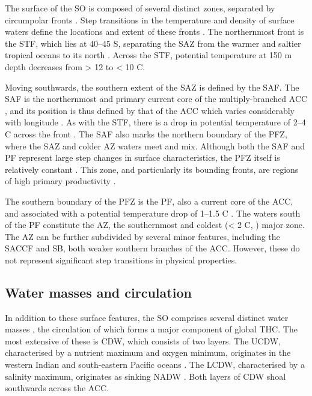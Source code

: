 The surface of the \ac{SO} is composed of several distinct zones, separated by circumpolar fronts .
Step transitions in the temperature and density of surface waters define the locations and extent of these fronts \cite{Sokolov:2002tc,Orsi:1995va}.
The northernmost front is the \ac{STF}, which lies at \textapprox{}40--45\textdegree{} S, separating the \ac{SAZ} from the warmer and saltier tropical oceans to its north \cite{Sokolov:2002tc}.
Across the \ac{STF}, potential temperature at 150 m depth decreases from \textgreater{} 12 to \textless{} 10 \textdegree{}C.

Moving southwards, the southern extent of the \ac{SAZ} is defined by the \ac{SAF}.
The \ac{SAF} is the northernmost and primary current core of the multiply-branched \ac{ACC} \cite{Sokolov:2009wp}, and its position is thus defined by that of the \ac{ACC} which varies considerably with longitude \cite{Moore:1999to}.
As with the \ac{STF}, there is a drop in potential temperature of 2--4 \textdegree{}C across the front \cite{Sokolov:2002tc}.
The \ac{SAF} also marks the northern boundary of the \ac{PFZ}, where the \ac{SAZ} and colder \ac{AZ} waters meet and mix.
Although both the \ac{SAF} and \ac{PF} represent large step changes in surface characteristics, the \ac{PFZ} itself is relatively constant \cite{WhitworthIII:1987ky}.
This zone, and particularly its bounding fronts, are regions of high primary productivity \citep[e.g.][]{Laubscher:1993hu,Abell:2005ji}.

The southern boundary of the \ac{PFZ} is the \ac{PF}, also a current core of the \ac{ACC}, and associated with a potential temperature drop of \textapprox{}1--1.5 \textdegree{}C \cite{Moore:1999to}.
The waters south of the \ac{PF} constitute the \ac{AZ}, the southernmost and coldest (\textless{} 2 \textdegree{}C, \citet{Sokolov:2002tc}) major zone.
The \ac{AZ} can be further subdivided by several minor features, including the \ac{SACCF} and \ac{SB}, both weaker southern branches of the \ac{ACC}.
However, these do not represent significant step transitions in physical properties.

\subsection{Water masses and circulation}

In addition to these surface features, the \ac{SO} comprises several distinct water masses , the circulation of which forms a major component of global \ac{THC}.
The most extensive of these is \ac{CDW}, which consists of two layers.
The \ac{UCDW}, characterised by a nutrient maximum and oxygen minimum, originates in the western Indian and south-eastern Pacific oceans \cite{Orsi:1995va}.
The \ac{LCDW}, characterised by a salinity maximum, originates as sinking \ac{NADW} \cite{WhitworthIII:1987ky}.
Both layers of \ac{CDW} shoal southwards across the \ac{ACC}.


